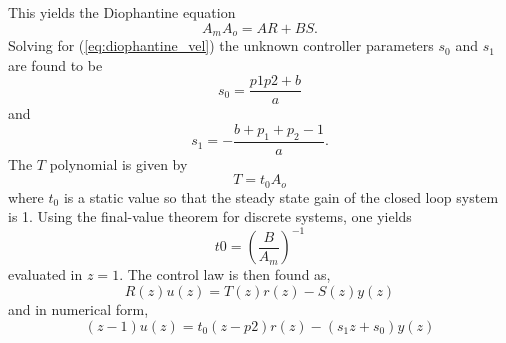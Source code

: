\documentclass[12pt,a4paper]{article}
\begin{document}
This yields the Diophantine equation
\begin{equation}
    \label{eq:diophantine_vel}
    A_mA_o = AR + BS.
\end{equation}
Solving for (\ref{eq:diophantine_vel}) the unknown controller parameters $s_0$
and $s_1$ are found to be
\begin{equation}
    \label{eq:s0_vel}
    s_0 = \frac{p1p2+b}{a}
\end{equation}
and
\begin{equation}
    \label{eq:s1_vel}
    s_1 = -\frac{b + p_1 + p_2 -1}{a}.
\end{equation}
The $T$ polynomial is given by 
\begin{equation}
    \label{eq:T_vel}
    T = t_0A_o
\end{equation}
where $t_0$ is a static value so that the steady state gain of the closed loop
system is 1. Using the final-value theorem for discrete systems, one yields
\begin{equation}
    \label{eq:t0_vel}
    t0 = \left (\frac{B}{A_m} \right )^{-1}
\end{equation}
evaluated in $z=1$. The control law is then found as,
\begin{equation}
    R(z)u(z)=T(z)r(z)-S(z)y(z)
    \label{eq:contlaw}
\end{equation}
and in numerical form,
\begin{equation}
    (z-1)u(z)=t_0(z-p2)r(z)-(s_1z + s_0)y(z)
\end{equation}
\end{document}

